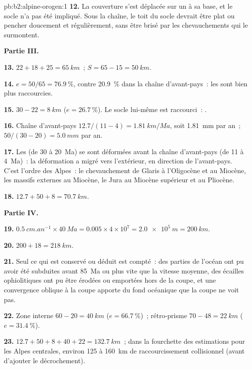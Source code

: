 \begin{solution}{pb:b2:alpine-orogen:1}
\textbf{12.} La couverture s'est déplacée sur un  à sa base, et le socle n'a pas été
impliqué. Sous la chaîne, le toit du socle devrait être plat ou pencher doucement et
régulièrement, sans être brisé par les chevauchements qui le surmontent.

\noindent\textbf{Partie III.}

\textbf{13.} $22 + 18 + 25 = \qty{65}{km}$~; $S = 65 - 15 = \qty{50}{km}$.

\textbf{14.} $e = 50/65 = \qty{76.9}{\percent}$, contre \qty{20.9}{\percent} dans la
chaîne d'avant-pays~: les  sont bien plus raccourcies.

\textbf{15.} $30 - 22 = \qty{8}{km}$ ($e = \qty{26.7}{\percent}$). Le socle lui-même est
raccourci~: .

\textbf{16.} Chaîne d'avant-pays $12.7/(11 - 4) = \qty{1.81}{km/Ma}$, soit
\qty{1.81}{mm} par an~;  $50/(30 - 20) = \qty{5.0}{mm}$ par an.

\textbf{17.} Les  (de 30 à \qty{20}{Ma}) se sont déformées avant la chaîne d'avant-pays (de 11 à
\qty{4}{Ma})~: la déformation a migré vers l'extérieur, en direction de l'avant-pays. C'est l'ordre des
Alpes~: le chevauchement de Glaris à l'Oligocène et au Miocène, les massifs externes au Miocène,
le Jura au Miocène supérieur et au Pliocène.

\textbf{18.} $12.7 + 50 + 8 = \qty{70.7}{km}$.

\noindent\textbf{Partie IV.}

\textbf{19.} $\qty{0.5}{cm.an^{-1}}\times\qty{40}{Ma} = 0.005\times4\times10^7 =
\qty{2.0e5}{m} = \qty{200}{km}$.

\textbf{20.} $200 + 18 = \qty{218}{km}$.

\textbf{21.} Seul ce qui est conservé ou déduit est compté~: des parties de l'océan ont pu avoir été
subduites avant \qty{85}{Ma} ou plus vite que la vitesse moyenne, des écailles ophiolitiques ont pu être
érodées ou emportées hors de la coupe, et une convergence oblique à la coupe apporte
du fond océanique que la coupe ne voit pas.

\textbf{22.} Zone interne $60 - 20 = \qty{40}{km}$ ($e = \qty{66.7}{\percent}$)~; rétro-prisme
$70 - 48 = \qty{22}{km}$ ($e = \qty{31.4}{\percent}$).

\textbf{23.} $12.7 + 50 + 8 + 40 + 22 = \qty{132.7}{km}$~; dans la fourchette des estimations
pour les Alpes centrales, environ 125 à \qty{160}{km} de raccourcissement collisionnel (avant d'ajouter
le décrochement).


\end{solution}
